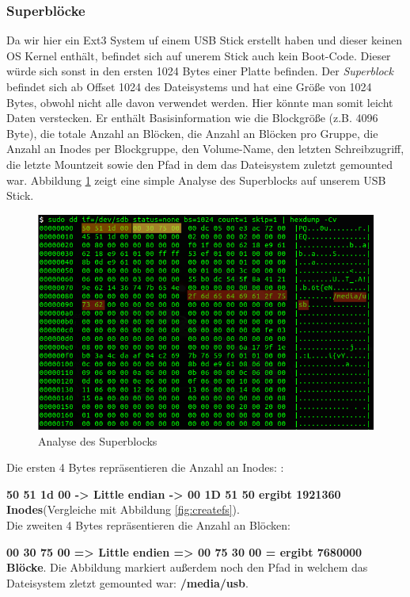 \subsubsection{Superblöcke}

Da wir hier ein Ext3 System uf einem USB Stick erstellt haben und dieser keinen OS Kernel enthält, befindet sich auf unerem Stick auch kein Boot-Code. Dieser würde sich sonst in den ersten 1024 Bytes einer Platte befinden. Der \textit{Superblock} befindet sich ab Offset 1024 des Dateisystems und hat eine Größe von 1024 Bytes, obwohl nicht alle davon verwendet werden. Hier könnte man somit leicht Daten verstecken. Er enthält Basisinformation wie die Blockgröße (z.B. 4096 Byte), die totale Anzahl an Blöcken, die Anzahl an Blöcken pro Gruppe, die Anzahl an Inodes per Blockgruppe, den Volume-Name, den letzten Schreibzugriff, die letzte Mountzeit sowie den Pfad in dem das Dateisystem zuletzt gemounted war. Abbildung \ref{fig:superblock} zeigt eine simple Analyse des Superblocks auf unserem USB Stick.

\begin{figure}[H]
	\centering
	\includegraphics[width=12cm,keepaspectratio=true]{pictures/superblock.png}
	\caption{
		Analyse des Superblocks
	}
	\label{fig:superblock}
\end{figure}

Die ersten 4 Bytes repräsentieren die Anzahl an Inodes: \cite{Ext2.07.01.2022}:

\textbf{50 51 1d 00 -> Little endian -> 00 1D 51 50 ergibt 1921360 Inodes}(Vergleiche mit Abbildung \ref{fig:createfs}).\\Die zweiten 4 Bytes repräsentieren die Anzahl an Blöcken:

\textbf{00 30 75 00 => Little endien => 00 75 30 00 = ergibt 7680000 Blöcke}. Die Abbildung markiert außerdem noch den Pfad in welchem das Dateisystem zletzt gemounted war: \textbf{/media/usb}.


